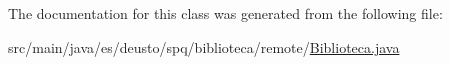 The documentation for this class was generated from the following file\+:\begin{DoxyCompactItemize}
\item 
src/main/java/es/deusto/spq/biblioteca/remote/\mbox{\hyperlink{_biblioteca_8java}{Biblioteca.\+java}}\end{DoxyCompactItemize}
